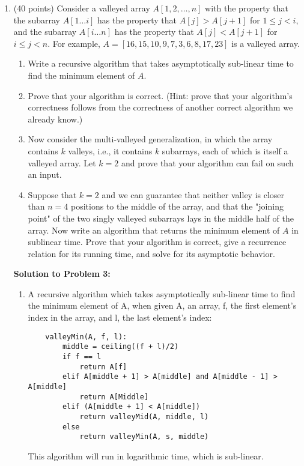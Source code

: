 \documentclass[12pt]{article}
\begin{document}
\begin{enumerate}
    \item (40 points) Consider a valleyed array $A[1, 2, \ldots, n]$ with the property that the subarray $A[1\ldots i]$ has the property that $A[j] > A[j + 1]$ for $1 \leq j < i$, and the subarray $A[i \ldots n]$ has the property that $A[j] < A[j + 1]$ for $i \leq j < n$. For example, \newline $A = [16, 15, 10, 9, 7, 3, 6, 8, 17, 23]$ is a valleyed array.
    
    \begin{enumerate}
        \item Write a recursive algorithm that takes asymptotically sub-linear time to find the minimum element of $A$.
        \item Prove that your algorithm is correct. (Hint: prove that your algorithm's correctness follows from the correctness of another correct algorithm we already know.)
        \item Now consider the multi-valleyed generalization, in which the array contains $k$ valleys, i.e., it contains $k$ subarrays, each of which is itself a valleyed array. Let $k = 2$ and prove that your algorithm can fail on such an input.
        \item Suppose that $k = 2$ and we can guarantee that neither valley is closer than $n=4$ positions to the middle of the array, and that the "joining point" of the two singly valleyed subarrays lays in the middle half of the array. Now write an algorithm that returns the minimum element of $A$ in sublinear time. Prove that your algorithm is correct, give a recurrence relation for its running time, and solve for its asymptotic behavior.
    \end{enumerate}
 \pagebreak
 \textbf{Solution to Problem 3:}

\begin{enumerate}
    (Assume zero indexing for this entire solution) \newline
    \item 
    A recursive algorithm which takes asymptotically sub-linear time to find the minimum element of A, when given A, an array, f, the first element's index in the array, and l, the last element's index:
    \begin{verbatim}
    valleyMin(A, f, l):
        middle = ceiling((f + l)/2)
        if f == l
            return A[f]
        elif A[middle + 1] > A[middle] and A[middle - 1] > A[middle]
            return A[Middle]
        elif (A[middle + 1] < A[middle])
            return valleyMid(A, middle, l)
        else
            return valleyMin(A, s, middle)
    \end{verbatim}
    This algorithm will run in logarithmic time, which is sub-linear.
    

\end{enumerate}
\end{enumerate}
\end{document}

